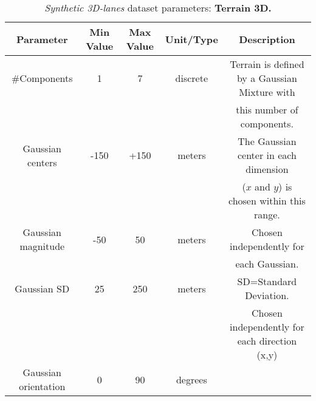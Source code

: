 \documentclass[10pt,twocolumn,letterpaper]{article}
\begin{document}
\setlength{\heavyrulewidth}{1.5pt}
\setlength{\abovetopsep}{4pt}
\begin{table*}[h]
	\centering
	\caption{\emph{Synthetic 3D-lanes} dataset parameters: \textbf{Terrain 3D.}}
	\begin{tabular} {*5c}
		\toprule
		\textbf{Parameter} &  \textbf{Min Value} &  \textbf{Max Value} & \textbf{Unit/Type} & \textbf{Description}  \\
		\toprule 
		\#Components   & 1 & 7 & discrete & Terrain is defined by a Gaussian Mixture with \\
		& & & &  this number of components.\\
		\midrule
		Gaussian centers   & -150 & +150 & meters & The Gaussian center in each dimension \\
		& & & & ($x$ and $y$) is chosen within this range.\\
		\midrule
		
		Gaussian magnitude & -50 & 50 & meters & Chosen independently for \\
		& & & & each Gaussian. \\
		\midrule
		Gaussian SD & 25 & 250 & meters & SD=Standard Deviation.\\
		& & & & Chosen independently for each direction (x,y)\\
		\midrule
		Gaussian orientation & 0 & 90 & degrees &\\
		\bottomrule
	\end{tabular} 
	\label{tab:params1}
\end{table*}
\end{document}
